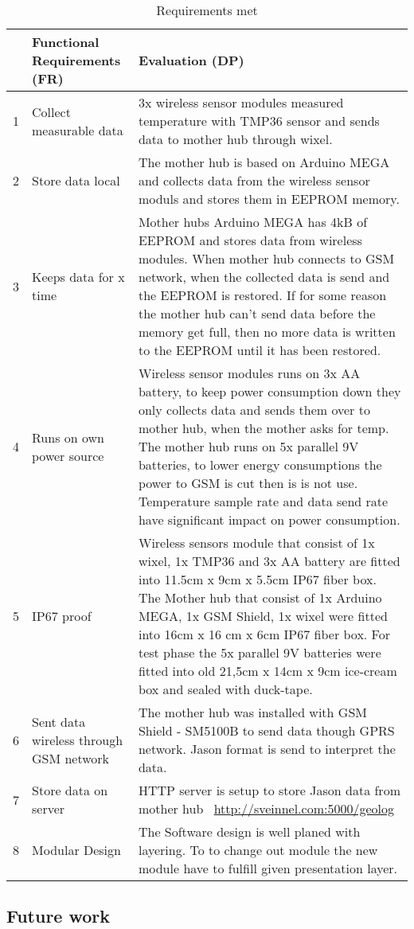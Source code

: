  \begin{table}[H]
 	\caption{Requirements met}
 	\begin{tabular}{|l|p{4cm}| p{11.2cm} |}
 		
 		\hline
 		& \textbf{Functional Requirements (FR)}  & \textbf{Evaluation (DP)} \\  
 		\hline 1 &  Collect measurable data & 3x wireless sensor modules measured temperature with  TMP36 \cite{Devices2010} sensor and sends data to mother hub through wixel. \\ 
 		           		
 		\hline 2 & Store data local &   The mother hub is based on Arduino MEGA and collects data from the wireless sensor moduls and stores them in EEPROM memory. \\
 	
 		\hline 3 & Keeps data for x time &  Mother hubs Arduino MEGA \cite{arduinoMega} has 4kB of EEPROM and stores  data from wireless modules. When mother hub connects to GSM network, when the collected data is send and the EEPROM is restored. If for some reason the mother hub can't send data before the memory get full, then no more data is written to the EEPROM until it has been restored.  \\
 	
 		\hline 4 & Runs on own power source & Wireless sensor modules runs on 3x AA battery, to keep power consumption down they only collects data and sends them over to mother hub, when the mother asks for temp. The mother hub runs on 5x parallel 9V batteries, to lower energy consumptions the power to GSM is cut then is is not use. Temperature sample rate and data send rate have significant impact on power consumption. \\ 
 	
 		\hline 5 & IP67 proof &   Wireless sensors module that consist of 1x wixel, 1x TMP36 and 3x AA battery are fitted into 11.5cm x 9cm x 5.5cm IP67 fiber box. The Mother hub that consist of 1x Arduino MEGA, 1x GSM Shield, 1x wixel were fitted into 16cm x 16 cm x 6cm IP67 fiber box. For test phase the 5x parallel 9V batteries were fitted into old 21,5cm x 14cm x 9cm ice-cream box and sealed with duck-tape. \\
 	
 		\hline 6 & Sent data wireless through GSM network & The mother hub was installed with GSM Shield - SM5100B \cite{Sparkfun2014} to send data though GPRS network. Jason format is send to interpret the data. \\ 
 	
 		\hline 7 & Store data on server & HTTP server is setup to store Jason data from mother hub ~\url{http://sveinnel.com:5000/geolog} \\ 
 	
 		\hline 8 & Modular Design & The Software design is well planed with layering. To to change out module the new module have to fulfill given presentation layer.  \\
 		\hline
 	\end{tabular}
 \end{table}
 
\subsection{Future work}

